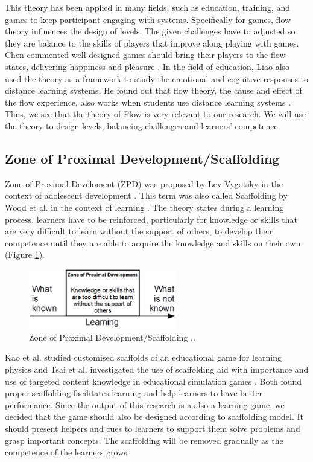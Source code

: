 \documentclass[12pt, a4paper]{report}
\begin{document}
This theory has been applied in many fields, such as education, training, and games to keep participant engaging with systems. Specifically for games, flow theory influences the design of levels. The given challenges have to  adjusted so they are balance to the skills of players that improve along playing with games. Chen commented well-designed games should bring their players to the flow states, delivering happiness and pleasure \cite{chen2007flow}. In the field of education, Liao also used the theory as a framework to study the emotional and cognitive responses to distance learning systems. He found out that flow theory, the cause and effect of the flow experience, also works  when students use distance learning systems \cite{liao2006flow}. Thus, we see that the theory of Flow is very relevant to our research. We will use the theory to design levels, balancing challenges and learners' competence. 

\subsection{Zone of Proximal Development/Scaffolding}
Zone of Proximal Develoment (ZPD) was proposed by Lev Vygotsky in the context of adolescent development \cite{vygotsky1978mind}. This term was also called Scaffolding by Wood et al. in the context of learning \cite{wood1976role}. The theory states during a learning process, learners have to be reinforced, particularly for knowledge or skills that are very difficult to learn without the support of others, to develop their competence until they are able to acquire the knowledge and skills on their own (Figure \ref{scaffolding}). 

\begin{figure}[ht]
\centering
\includegraphics[width=6.5cm]{scaffolding}
\caption{Zone of Proximal Development/Scaffolding \cite{vygotsky1978mind},\cite{wood1976role}.}
\label{scaffolding}
\end{figure}

Kao et al. studied customised scaffolds of an educational game for learning physics \cite{kao2015designing} and Tsai et al. investigated the use of scaffolding aid with importance and use of targeted content knowledge in educational simulation games \cite{tsai2013importance}. Both found proper scaffolding facilitates learning and help learners to have better performance. Since the output of this research is a also a learning game, we decided that the game should also be designed according to scaffolding model. It should present helpers and cues to learners to support them solve problems and grasp important concepts. The scaffolding will be removed gradually as the competence of the learners grows.
\end{document}
